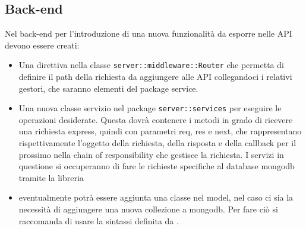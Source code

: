 \documentclass[12pt,a4paper]{article}
\begin{document}
	\subsection{Back-end}
	Nel back-end per l'introduzione di una nuova funzionalità da esporre nelle API devono essere creati:
	\begin{itemize}
	\item Una direttiva nella classe \texttt{server::middleware::Router} che permetta di definire il path della richiesta da aggiungere alle API collegandoci i relativi gestori, che saranno elementi del package service.
	\item Una nuova classe servizio nel package \texttt{server::services} per eseguire le operazioni desiderate. Questa dovrà contenere i metodi in grado di ricevere una richiesta express, quindi con parametri req, res e next, che rappresentano rispettivamente l’oggetto della richiesta, della risposta e della callback per il prossimo  nella chain of responsibility che gestisce la richiesta. I servizi in questione si occuperanno di fare le richieste specifiche al database mongodb tramite la libreria 
	\item eventualmente potrà essere aggiunta una classe nel model, nel caso ci sia la necessità di aggiungere una nuova collezione a mongodb. Per fare ciò si raccomanda di usare la sintassi definita da .
	\end{itemize}
\end{document}
